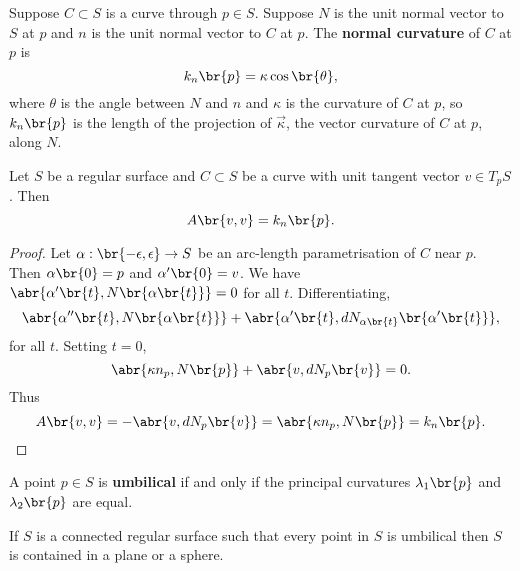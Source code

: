 \begin{definition}
Suppose $ C \subset S $ is a curve through $ p \in S $. Suppose $ N $ is the unit normal vector to $ S $ at $ p $ and $ n $ is the unit normal vector to $ C $ at $ p $. The \textbf{normal curvature} of $ C $ at $ p $ is
$$ k_n\br{p} = \kappa\cos\br{\theta}, $$
where $ \theta $ is the angle between $ N $ and $ n $ and $ \kappa $ is the curvature of $ C $ at $ p $, so $ k_n\br{p} $ is the length of the projection of $ \vec{\kappa} $, the vector curvature of $ C $ at $ p $, along $ N $.
\end{definition}

\begin{proposition}
Let $ S $ be a regular surface and $ C \subset S $ be a curve with unit tangent vector $ v \in T_pS $. Then
$$ A\br{v, v} = k_n\br{p}. $$
\end{proposition}

\begin{proof}
Let $ \alpha : \br{-\epsilon, \epsilon} \to S $ be an arc-length parametrisation of $ C $ near $ p $. Then $ \alpha\br{0} = p $ and $ \alpha'\br{0} = v $. We have $ \abr{\alpha'\br{t}, N\br{\alpha\br{t}}} = 0 $ for all $ t $. Differentiating,
$$ \abr{\alpha''\br{t}, N\br{\alpha\br{t}}} + \abr{\alpha'\br{t}, dN_{\alpha\br{t}}\br{\alpha'\br{t}}}, $$
for all $ t $. Setting $ t = 0 $,
$$ \abr{\kappa n_p, N\br{p}} + \abr{v, dN_p\br{v}} = 0. $$
Thus
$$ A\br{v, v} = -\abr{v, dN_p\br{v}} = \abr{\kappa n_p, N\br{p}} = k_n\br{p}. $$
\end{proof}

\pagebreak

\begin{definition}
A point $ p \in S $ is \textbf{umbilical} if and only if the principal curvatures $ \lambda_1\br{p} $ and $ \lambda_2\br{p} $ are equal.
\end{definition}

\begin{proposition}
If $ S $ is a connected regular surface such that every point in $ S $ is umbilical then $ S $ is contained in a plane or a sphere.
\end{proposition}


